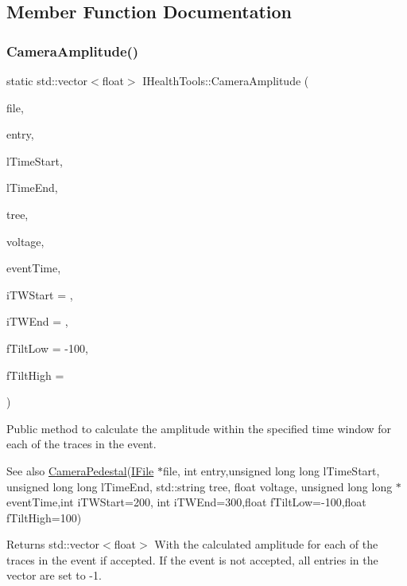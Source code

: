 \subsection{Member Function Documentation}
\mbox{\label{classIHealthTools_a93e06807e441043c9597391754537dc4}} 
\subsubsection{\texorpdfstring{Camera\+Amplitude()}{CameraAmplitude()}\hspace{0.1cm}{\footnotesize\ttfamily [1/3]}}
{\footnotesize\ttfamily static std\+::vector$<$float$>$ I\+Health\+Tools\+::\+Camera\+Amplitude (\begin{DoxyParamCaption}\item[{\hyperlink{classIFile}{I\+File} $\ast$}]{file,  }\item[{int}]{entry,  }\item[{unsigned long long}]{l\+Time\+Start,  }\item[{unsigned long long}]{l\+Time\+End,  }\item[{std\+::string}]{tree,  }\item[{float}]{voltage,  }\item[{unsigned long long $\ast$}]{event\+Time,  }\item[{int}]{i\+T\+W\+Start = {},  }\item[{int}]{i\+T\+W\+End = {},  }\item[{float}]{f\+Tilt\+Low = {\ttfamily -\/100},  }\item[{float}]{f\+Tilt\+High = {} }\end{DoxyParamCaption})\hspace{0.3cm}{\ttfamily [static]}}



Public method to calculate the amplitude within the specified time window for each of the traces in the event. 

\begin{DoxySeeAlso}{See also}
\hyperlink{classIHealthTools_aa6bdf03f0f7595eec0a894c7c73134ea}{Camera\+Pedestal}(\hyperlink{classIFile}{I\+File} $\ast$file, int entry,unsigned long long l\+Time\+Start, unsigned long long l\+Time\+End, std\+::string tree, float voltage, unsigned long long $\ast$event\+Time,int i\+T\+W\+Start=200, int i\+T\+W\+End=300,float f\+Tilt\+Low=-\/100,float f\+Tilt\+High=100)
\end{DoxySeeAlso}
\begin{DoxyReturn}{Returns}
std\+::vector$<$float$>$ With the calculated amplitude for each of the traces in the event if accepted. If the event is not accepted, all entries in the vector are set to -\/1. 
\end{DoxyReturn}
\mbox{\label{classIHealthTools_a51f94cdf8490167d3169defc6d214feb}} 
